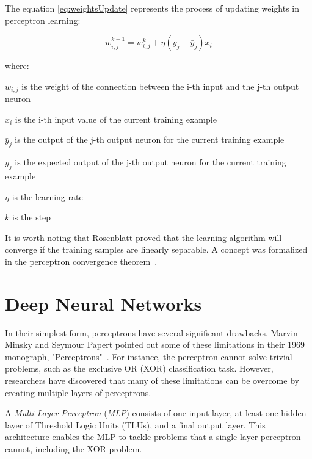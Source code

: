 The equation \ref{eq:weightsUpdate} represents the process of updating weights in perceptron learning:

\begin{equation}
    w_{i,j}^{k + 1} = w_{i,j}^k + \eta(y_j - \bar{y}_j)x_i
    \label{eq:weightsUpdate}
\end{equation}

where:
\begin{eqwhere}[2cm]
\item[$w_{i,j}$] is the weight of the connection between the i-th input and the j-th output neuron
\item[$x_i$] is the i-th input value of the current training example
\item[$\bar{y}_j$] is the output of the j-th output neuron for the current training example
\item[$y_j$] is the expected output of the j-th output neuron for the current training example
\item[$\eta$] is the learning rate
\item[$k$] is the step
\end{eqwhere}

It is worth noting that Rosenblatt proved that the learning algorithm will converge if the training samples are linearly separable. A concept was formalized in the perceptron convergence theorem~\cite{UMzUSLiTF}.

\section{Deep Neural Networks}

In their simplest form, perceptrons have several significant drawbacks. Marvin Minsky and Seymour Papert pointed out some of these limitations in their 1969 monograph, "Perceptrons"~\cite{PerceptronsBook}. For instance, the perceptron cannot solve trivial problems, such as the exclusive OR (XOR) classification task. However, researchers have discovered that many of these limitations can be overcome by creating multiple layers of perceptrons. 

A \textit{Multi-Layer Perceptron} (\textit{MLP}) consists of one input layer, at least one hidden layer of Threshold Logic Units (TLUs), and a final output layer. This architecture enables the MLP to tackle problems that a single-layer perceptron cannot, including the XOR problem.


